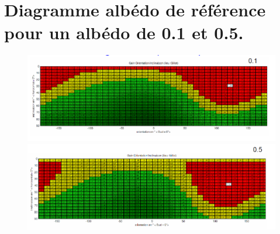 \documentclass[12pt,a4paper,openright]{report}
\begin{document}
\chapter{Diagramme albédo de référence pour un albédo de 0.1 et 0.5.}
\begin{figure}[h!]
\includegraphics[scale=0.6]{diagramme1}
\includegraphics[scale=0.6]{diagramme2}
\end{figure}
\end{document}

